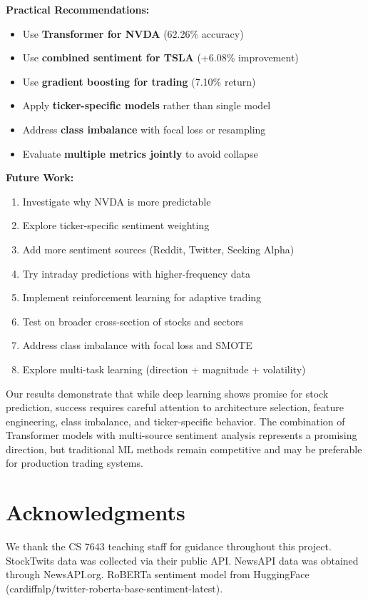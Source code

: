 \documentclass[10pt,twocolumn]{article}
\begin{document}
\textbf{Practical Recommendations:}
\begin{itemize}
\item Use \textbf{Transformer for NVDA} (62.26\% accuracy)
\item Use \textbf{combined sentiment for TSLA} (+6.08\% improvement)
\item Use \textbf{gradient boosting for trading} (7.10\% return)
\item Apply \textbf{ticker-specific models} rather than single model
\item Address \textbf{class imbalance} with focal loss or resampling
\item Evaluate \textbf{multiple metrics jointly} to avoid collapse
\end{itemize}

\textbf{Future Work:}
\begin{enumerate}
\item Investigate why NVDA is more predictable
\item Explore ticker-specific sentiment weighting
\item Add more sentiment sources (Reddit, Twitter, Seeking Alpha)
\item Try intraday predictions with higher-frequency data
\item Implement reinforcement learning for adaptive trading
\item Test on broader cross-section of stocks and sectors
\item Address class imbalance with focal loss and SMOTE
\item Explore multi-task learning (direction + magnitude + volatility)
\end{enumerate}

Our results demonstrate that while deep learning shows promise for stock prediction, success requires careful attention to architecture selection, feature engineering, class imbalance, and ticker-specific behavior. The combination of Transformer models with multi-source sentiment analysis represents a promising direction, but traditional ML methods remain competitive and may be preferable for production trading systems.

\section*{Acknowledgments}

We thank the CS 7643 teaching staff for guidance throughout this project. StockTwits data was collected via their public API. NewsAPI data was obtained through NewsAPI.org. RoBERTa sentiment model from HuggingFace (cardiffnlp/twitter-roberta-base-sentiment-latest).
\end{document}
